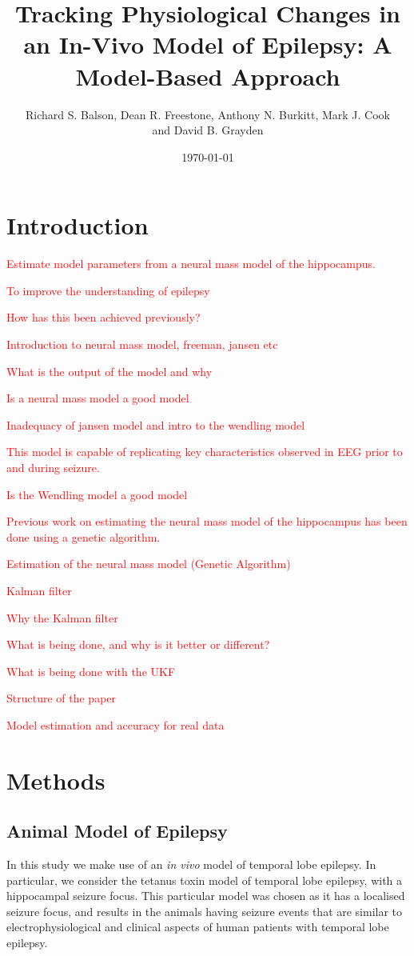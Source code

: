 \documentclass[10pt]{article}%
\title{Tracking Physiological Changes in an In-Vivo Model of Epilepsy: A Model-Based Approach}
\date{\today}
\author{Richard S. Balson, Dean R. Freestone, Anthony N. Burkitt, Mark J. Cook \\ and David B. Grayden}
\newcommand\red{\textcolor{red}}
\begin{document}
\maketitle

\section{Introduction}

\red{Estimate model parameters from a neural mass model of the hippocampus.}

\red{To improve the understanding of epilepsy} 

\red{How has this been achieved previously?}

\red{Introduction to neural mass model, freeman, jansen etc}

\red{What is the output of the model and why}

\red{Is a neural mass model a good model}

\red{Inadequacy of jansen model and intro to the wendling model}

\red{This model is capable of replicating key characteristics observed in EEG prior to and during seizure.}

\red{Is the Wendling model a good model}

\red{Previous work on estimating the neural mass model of the hippocampus has been done using a genetic algorithm.}

\red{Estimation of the neural mass model (Genetic Algorithm)}

\red{Kalman filter}

\red{Why the Kalman filter}

\red{What is being done, and why is it better or different?}

\red{What is being done with the UKF}

\red{Structure of the paper}

\red{Model estimation and accuracy for real data}

\section{Methods}

\subsection{Animal Model of Epilepsy}

In this study we make use of an \textsl{in vivo} model of temporal lobe epilepsy. In particular, we consider the tetanus toxin model of temporal lobe epilepsy, with a hippocampal seizure focus. This particular model was chosen as it has a localised seizure focus, and results in the animals having seizure events that are similar to electrophysiological and clinical aspects of human patients with temporal lobe epilepsy. 
\end{document}
